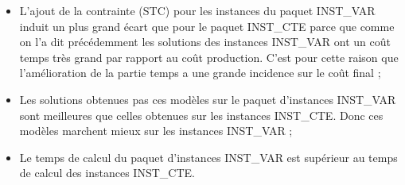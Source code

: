 {\begin{itemize}[label=$\square$]
	\item L'ajout de la contrainte (STC) pour les instances du paquet INST\_VAR induit un plus grand écart que pour le paquet INST\_CTE parce que comme on l'a dit précédemment les solutions des instances INST\_VAR ont un coût temps très grand par rapport au coût production. C'est pour cette raison que l'amélioration de la partie temps a une grande incidence sur le coût final ;
	\item Les solutions obtenues pas ces modèles sur le paquet d'instances INST\_VAR sont meilleures que celles obtenues sur les instances INST\_CTE. Donc ces modèles marchent mieux sur les instances INST\_VAR ;
	\item Le temps de calcul du paquet d'instances INST\_VAR est supérieur au temps de calcul des instances INST\_CTE.

\end{itemize}

}
